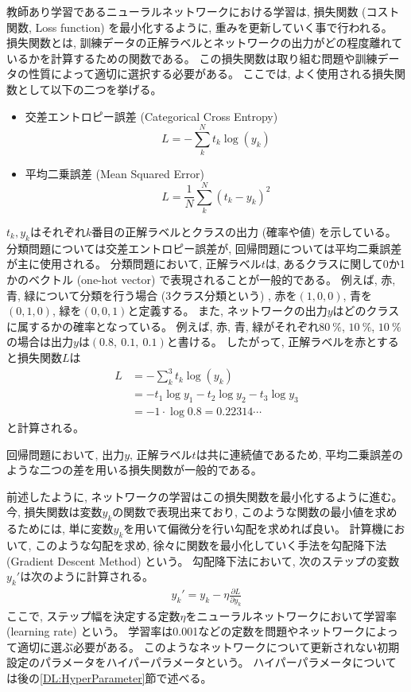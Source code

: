 教師あり学習であるニューラルネットワークにおける学習は, 損失関数 (コスト関数, Loss function) を最小化するように, 重みを更新していく事で行われる。
損失関数とは, 訓練データの正解ラベルとネットワークの出力がどの程度離れているかを計算するための関数である。
この損失関数は取り組む問題や訓練データの性質によって適切に選択する必要がある。
ここでは, よく使用される損失関数として以下の二つを挙げる。
\begin{itemize}
  \item 交差エントロピー誤差 (Categorical Cross Entropy)
\begin{equation}
 L = - \sum^N_k t_k \log{(y_k)}
\end{equation}
  \item 平均二乗誤差 (Mean Squared Error)
\begin{equation}
 L = \frac{1}{N} \sum^N_k(t_k - y_k)^2
\end{equation}
\end{itemize}
$t_k, y_k$はそれぞれ$k$番目の正解ラベルとクラスの出力 (確率や値) を示している。
分類問題については交差エントロピー誤差が, 回帰問題については平均二乗誤差が主に使用される。
\newpage
分類問題において, 正解ラベル$t$は, あるクラスに関して0か1かのベクトル (one-hot vector) で表現されることが一般的である。
例えば, 赤, 青, 緑について分類を行う場合 (3クラス分類という) , 赤を$(1, 0, 0)$, 青を$(0, 1, 0)$, 緑を$(0, 0, 1)$と定義する。
また, ネットワークの出力$y$はどのクラスに属するかの確率となっている。
例えば, 赤, 青, 緑がそれぞれ$80\ \%$, $10\ \%$, $10\ \%$の場合は出力$y$は$(0.8,\ 0.1,\ 0.1)$と書ける。
したがって, 正解ラベルを赤とすると損失関数$L$は
\begin{equation}
 \begin{split}
  L &= - \sum^3_k t_k \log{(y_k)} \\
    &= - t_1 \log{y_1} - t_2 \log{y_2} - t_3 \log{y_3} \\
    &= - 1 \cdot \log{0.8} = 0.22314 \cdots
 \end{split}
\end{equation}
と計算される。

回帰問題において, 出力$y$, 正解ラベル$t$は共に連続値であるため, 平均二乗誤差のような二つの差を用いる損失関数が一般的である。

前述したように, ネットワークの学習はこの損失関数を最小化するように進む。
今, 損失関数は変数$y_k$の関数で表現出来ており, このような関数の最小値を求めるためには, 単に変数$y_k$を用いて偏微分を行い勾配を求めれば良い。
計算機において, このような勾配を求め, 徐々に関数を最小化していく手法を勾配降下法 (Gradient Descent Method) という。
勾配降下法において, 次のステップの変数$y_k'$は次のように計算される。
\begin{equation}
 \begin{split}
  y_k' = y_k - \eta \frac{\partial L}{\partial y_k}
 \end{split}
\end{equation}
ここで, ステップ幅を決定する定数$\eta$をニューラルネットワークにおいて学習率 (learning rate) という。
学習率は0.001などの定数を問題やネットワークによって適切に選ぶ必要がある。
このようなネットワークについて更新されない初期設定のパラメータをハイパーパラメータという。
ハイパーパラメータについては後の\ref{DL:HyperParameter}節で述べる。

